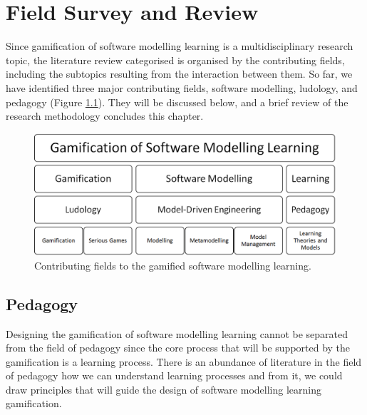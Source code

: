 \documentclass[12pt, a4paper]{report}
\begin{document}
\chapter{Field Survey and Review}
\label{Field Survey and Review}
Since gamification of software modelling learning is a multidisciplinary research topic, the literature review categorised is organised by the contributing fields, including the subtopics resulting from the interaction between them. So far, we have identified three major contributing fields, software modelling, ludology, and pedagogy (Figure \ref{smlg2}). They will be discussed below, and a brief review of the research methodology concludes this chapter.

\begin{figure}[ht]
\centering
\includegraphics[width=12cm]{smlg2}
\caption{Contributing fields to the gamified software modelling learning.}
\label{smlg2}
\end{figure}

\section{Pedagogy}
\label{Pedagogy}
Designing the gamification of software modelling learning cannot be separated from the field of pedagogy since the core process that will be supported by the gamification is a learning process. There is an abundance of literature in the field of pedagogy how we can understand learning processes and from it, we could draw principles that will guide the design of software modelling learning gamification. 
\end{document}
